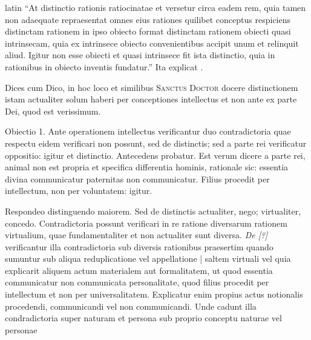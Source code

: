 \begin{otherlanguage*}{latin}
\pstart
 \enquote{At distinctio rationis ratiocinatae et versetur circa eadem rem, quia tamen non adaequate repraesentat omnes eius rationes quilibet conceptus respiciens distinctam rationem in ipso obiecto format distinctam rationem obiecti quasi intrinsecam, quia ex intrinsece obiecto convenientibus accipit unum et relinquit aliud. Igitur non esse obiecti et quasi intrinsece fit ista distinctio, quia in rationibus in obiecto inventis fundatur.} Ita explicat  . 
\pend

\pstart
 Dices cum  Dico, in hoc loco et similibus \textsc{Sanctus Doctor} docere distinctionem istam actualiter solum haberi per conceptiones intellectus et non ante ex parte Dei, quod est verissimum. 
\pend

\pstart
 Obiectio 1. Ante operationem intellectus verificantur duo contradictoria quae respectu eidem verificari non possunt, sed de distinctis; sed a parte rei verificatur oppositio: igitur et distinctio. Antecedens probatur. Est verum dicere a parte rei, animal non est propria et specifica differentia hominis, rationale sic: essentia divina communicatur paternitas non communicatur. Filius procedit per intellectum, non per voluntatem: igitur. 
\pend

\pstart
 Respondeo distinguendo maiorem. Sed de distinctis actualiter, nego; virtualiter, concedo. Contradictoria possunt verificari in re ratione diversarum rationem virtualium, quae fundamentaliter et non actualiter sunt diversa. \emph{De [?]} verificantur illa contradictoria sub diversis rationibus praesertim quando sumuntur sub aliqua reduplicatione vel appellatione \textnormal{|}  saltem virtuali vel quia explicarit aliquem actum materialem aut formalitatem, ut quod essentia communicatur non communicata personalitate, quod filius procedit per intellectum et non per universalitatem. Explicatur enim propius actus notionalis procedendi, communicandi vel non communicandi. Unde cadunt illa condradictoria super naturam et persona sub proprio conceptu naturae vel personae 
\pend


\end{otherlanguage*}
